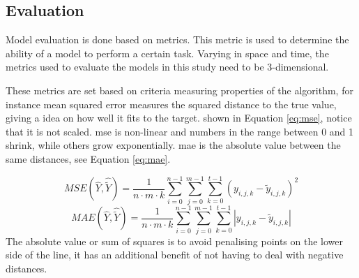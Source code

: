 \subsection{Evaluation} \label{sec:evaluation}
Model evaluation is done based on metrics. This metric is used to determine the ability of a model to perform a certain task. Varying in space and time, the metrics used to evaluate the models in this study need to be 3-dimensional.

These metrics are set based on criteria measuring properties of the algorithm, for instance mean squared error measures the squared distance to the true value, giving a idea on how well it fits to the target. shown in Equation \eqref{eq:mse}, notice that it is not scaled. \acrshort{mse} is non-linear and numbers in the range between 0 and 1 shrink, while others grow exponentially.  \acrfull{mae} is the absolute value between the same distances, see Equation \eqref{eq:mae}. 

\begin{equation} \label{eq:mse}
    MSE(\hat{Y},\hat{\tilde{Y}}) = \frac{1}{n\cdot m \cdot k} \sum_{i=0}^{n-1}\sum_{j=0}^{m-1}\sum_{k=0}^{t-1}(y_{i, j, k}-\tilde{y}_{i, j, k})^2
\end{equation} 
\begin{equation} \label{eq:mae}
    MAE(\hat{Y},\hat{\tilde{Y}}) = \frac{1}{n\cdot m \cdot k} \sum_{i=0}^{n-1}\sum_{j=0}^{m-1}\sum_{k=0}^{t-1}\left|y_{i, j, k}-\tilde{y}_{i, j, k}\right|
\end{equation} 
The absolute value or sum of squares is to avoid penalising points on the lower side of the line, it has an additional benefit of not having to deal with negative distances. 

